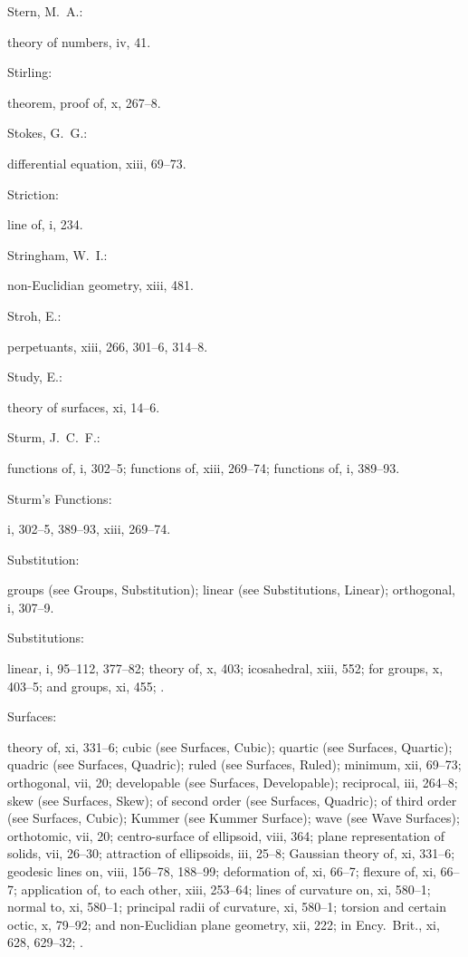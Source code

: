\documentclass[11pt,a4paper]{book}
\providecommand{\V}[1]{#1}
\providecommand{\IndexEntry}[2]{#1\dotfill #2\par}
\begin{document}
\IndexEntry{Stern, M.\ A.}: theory of numbers, \V{iv}, 41.

\IndexEntry{Stirling}: theorem, proof of, \V{x}, 267--8.

\IndexEntry{Stokes, G.\ G.}: differential equation, \V{xiii}, 69--73.

\IndexEntry{Striction}: line of, \V{i}, 234.

\IndexEntry{Stringham, W.\ I.}: non-Euclidian geometry, \V{xiii}, 481.

\IndexEntry{Stroh, E.}: perpetuants, \V{xiii}, 266, 301--6, 314--8.

\IndexEntry{Study, E.}: theory of surfaces, \V{xi}, 14--6.

\IndexEntry{Sturm, J.\ C.\ F.}: functions of, \V{i}, 302--5; functions of, \V{xiii}, 269--74; functions of, \V{i}, 389--93.

\IndexEntry{Sturm's Functions}: \V{i}, 302--5, 389--93, \V{xiii}, 269--74.

\IndexEntry{Substitution}: groups (see Groups, Substitution); linear (see Substitutions, Linear); orthogonal, \V{i}, 307--9.

\newpage

\setcounter{page}{125}

\IndexEntry{Substitutions}: linear, \V{i}, 95--112, 377--82; theory of, \V{x}, 403; icosahedral, \V{xiii}, 552; for groups, \V{x}, 403--5; and groups, \V{xi}, 455; .

\IndexEntry{Surfaces}: theory of, \V{xi}, 331--6; cubic (see Surfaces, Cubic); quartic (see Surfaces, Quartic); quadric (see Surfaces, Quadric); ruled (see Surfaces, Ruled); minimum, \V{xii}, 69--73; orthogonal, \V{vii}, 20; developable (see Surfaces, Developable); reciprocal, \V{iii}, 264--8; skew (see Surfaces, Skew); of second order (see Surfaces, Quadric); of third order (see Surfaces, Cubic); Kummer (see Kummer Surface); wave (see Wave Surfaces); orthotomic, \V{vii}, 20; centro-surface of ellipsoid, \V{viii}, 364; plane representation of solids, \V{vii}, 26--30; attraction of ellipsoids, \V{iii}, 25--8; Gaussian theory of, \V{xi}, 331--6; geodesic lines on, \V{viii}, 156--78, 188--99; deformation of, \V{xi}, 66--7; flexure of, \V{xi}, 66--7; application of, to each other, \V{xiii}, 253--64; lines of curvature on, \V{xi}, 580--1; normal to, \V{xi}, 580--1; principal radii of curvature, \V{xi}, 580--1; torsion and certain octic, \V{x}, 79--92; and non-Euclidian plane geometry, \V{xii}, 222; in Ency.\ Brit., \V{xi}, 628, 629--32; .
\end{document}
